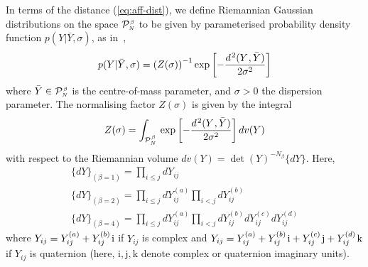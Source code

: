 \documentclass[draftclsnofoot]{IEEEtran}
\begin{document}
In terms of the distance (\ref{eq:aff-dist}), we define Riemannian Gaussian distributions on the space $\mathcal{P}^{\hspace{0.02cm}\scriptscriptstyle \beta}_{\scriptscriptstyle N}$ to be given by parameterised probability density function $p(Y|\bar{Y},\sigma)$, as in~\cite{Sa16}\cite{Sa17},
\begin{equation} \label{eq:gdensity}
p(Y|\bar{Y},\sigma) = \left(Z(\sigma)\right)^{-1}\exp\left[-\frac{d^{\hspace{0.03cm} 2}(Y\hspace{0.02cm},\bar{Y})}{2\sigma^2}\right]
\end{equation}
where $\bar{Y} \in \mathcal{P}^{\hspace{0.02cm}\scriptscriptstyle \beta}_{\scriptscriptstyle N}$ is the centre-of-mass parameter, and $\sigma > 0$ the dispersion parameter. The normalising factor $Z(\sigma)$ is given by the integral
\begin{equation} \label{eq:Z1}
  Z(\sigma) = \int_{\mathcal{P}^{\hspace{0.02cm}\scriptscriptstyle \beta}_{\scriptscriptstyle N}}\,\exp\left[-\frac{d^{\hspace{0.03cm} 2}(Y\hspace{0.02cm},\bar{Y})}{2\sigma^2}\right]dv(Y)
\end{equation}
with respect to the Riemannian volume $dv(Y) = \det(Y)^{-N_\beta}\lbrace dY\rbrace$. Here, 
$$
\begin{array}{l}
\lbrace dY\rbrace_{(\beta = 1)} = \prod_{i\leq j} dY_{ij}   \\[0.1cm]
\lbrace dY\rbrace_{(\beta = 2)}  = \prod_{i\leq j} dY^{(a)}_{ij}\prod_{i < j} dY^{(b)}_{ij}   \\[0.1cm]
\lbrace dY\rbrace_{(\beta = 4)} = \prod_{i\leq j} dY^{(a)}_{ij}\prod_{i < j} dY^{(b)}_{ij}
 dY^{(c)}_{ij}
 dY^{(d)}_{ij}
\end{array}
$$
where $Y_{ij} = Y^{(a)}_{ij} + Y^{(b)}_{ij}\hspace{0.04cm}\mathrm{i}$ if $Y_{ij}$ is complex and $Y_{ij} = Y^{(a)}_{ij} + Y^{(b)}_{ij}\hspace{0.04cm}\mathrm{i} + Y^{(c)}_{ij}\hspace{0.04cm}\mathrm{j} + Y^{(d)}_{ij}\hspace{0.04cm}\mathrm{k}$ if $Y_{ij}$ is quaternion (here, $\mathrm{i},\mathrm{j},\mathrm{k}$ denote complex or quaternion imaginary units).
\end{document}
